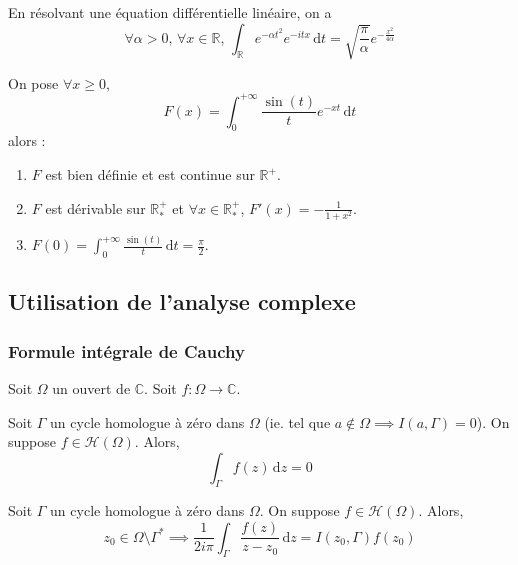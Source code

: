 
  \begin{application}
    En résolvant une équation différentielle linéaire, on a
    \[ \forall \alpha > 0, \, \forall x \in \mathbb{R}, \, \int_{\mathbb{R}} e^{-\alpha t^2} e^{-itx} \, \mathrm{d}t = \sqrt{\frac{\pi}{\alpha}} e^{-\frac{x^2}{4 \alpha}} \]
  \end{application}


  \begin{application}
    On pose $\forall x \geq 0$,
    \[ F(x) = \int_0^{+\infty} \frac{\sin(t)}{t} e^{-xt} \, \mathrm{d}t \]
    alors :
    \begin{enumerate}[label={\bfseries(\roman*)}]
      \item $F$ est bien définie et est continue sur $\mathbb{R}^+$.
      \item $F$ est dérivable sur $\mathbb{R}^+_*$ et $\forall x \in \mathbb{R}^+_*$, $F'(x) = -\frac{1}{1+x^2}$.
      \item $F(0) = \int_0^{+\infty} \frac{\sin(t)}{t} \, \mathrm{d}t = \frac{\pi}{2}$.
    \end{enumerate}
  \end{application}

  \subsection{Utilisation de l'analyse complexe}

  \subsubsection{Formule intégrale de Cauchy}


  Soit $\Omega$ un ouvert de $\mathbb{C}$. Soit $f : \Omega \rightarrow \mathbb{C}$.

  \begin{theorem}
    Soit $\Gamma$ un cycle homologue à zéro dans $\Omega$ (ie. tel que $a \notin \Omega \implies I(a, \Gamma) = 0$). On suppose $f \in \mathcal{H}(\Omega)$. Alors,
    \[ \int_\Gamma f(z) \, \mathrm{d}z = 0 \]
  \end{theorem}

  \begin{corollary}
    Soit $\Gamma$ un cycle homologue à zéro dans $\Omega$. On suppose $f \in \mathcal{H}(\Omega)$. Alors,
    \[ z_0 \in \Omega \setminus \Gamma^* \implies \frac{1}{2i\pi} \int_\Gamma \frac{f(z)}{z-z_0} \, \mathrm{d}z = I(z_0, \Gamma) f(z_0) \]
  \end{corollary}

